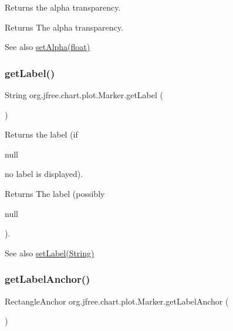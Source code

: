 Returns the alpha transparency.

\begin{DoxyReturn}{Returns}
The alpha transparency.
\end{DoxyReturn}
\begin{DoxySeeAlso}{See also}
\mbox{\hyperlink{classorg_1_1jfree_1_1chart_1_1plot_1_1_marker_aa8bd3303290bf0be26e17c90794a434f}{set\+Alpha(float)}} 
\end{DoxySeeAlso}
\mbox{\label{classorg_1_1jfree_1_1chart_1_1plot_1_1_marker_ade0e1e05ae18b887d6a4f3f50fdbdf74}} 
\subsubsection{\texorpdfstring{get\+Label()}{getLabel()}}
{\footnotesize\ttfamily String org.\+jfree.\+chart.\+plot.\+Marker.\+get\+Label (\begin{DoxyParamCaption}{ }\end{DoxyParamCaption})}

Returns the label (if
\begin{DoxyCode}
null 
\end{DoxyCode}
 no label is displayed).

\begin{DoxyReturn}{Returns}
The label (possibly
\begin{DoxyCode}
null 
\end{DoxyCode}
 ).
\end{DoxyReturn}
\begin{DoxySeeAlso}{See also}
\mbox{\hyperlink{classorg_1_1jfree_1_1chart_1_1plot_1_1_marker_a3e54b16046fd62f5c8bf9f2d5afee450}{set\+Label(\+String)}} 
\end{DoxySeeAlso}
\mbox{\label{classorg_1_1jfree_1_1chart_1_1plot_1_1_marker_a597f1b7b60843de8f4b75ec8fc28f086}} 
\subsubsection{\texorpdfstring{get\+Label\+Anchor()}{getLabelAnchor()}}
{\footnotesize\ttfamily Rectangle\+Anchor org.\+jfree.\+chart.\+plot.\+Marker.\+get\+Label\+Anchor (\begin{DoxyParamCaption}{ }\end{DoxyParamCaption})}

